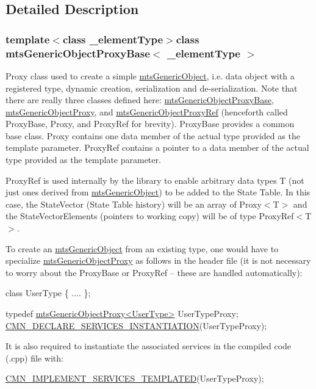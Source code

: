 \subsection{Detailed Description}
\subsubsection*{template$<$class \-\_\-element\-Type$>$class mts\-Generic\-Object\-Proxy\-Base$<$ \-\_\-element\-Type $>$}

Proxy class used to create a simple \hyperlink{classmts_generic_object}{mts\-Generic\-Object}, i.\-e. data object with a registered type, dynamic creation, serialization and de-\/serialization. Note that there are really three classes defined here\-: \hyperlink{classmts_generic_object_proxy_base}{mts\-Generic\-Object\-Proxy\-Base}, \hyperlink{classmts_generic_object_proxy}{mts\-Generic\-Object\-Proxy}, and \hyperlink{classmts_generic_object_proxy_ref}{mts\-Generic\-Object\-Proxy\-Ref} (henceforth called Proxy\-Base, Proxy, and Proxy\-Ref for brevity). Proxy\-Base provides a common base class. Proxy contains one data member of the actual type provided as the template parameter. Proxy\-Ref contains a pointer to a data member of the actual type provided as the template parameter.

Proxy\-Ref is used internally by the library to enable arbitrary data types T (not just ones derived from \hyperlink{classmts_generic_object}{mts\-Generic\-Object}) to be added to the State Table. In this case, the State\-Vector (State Table history) will be an array of Proxy$<$\-T$>$ and the State\-Vector\-Elements (pointers to working copy) will be of type Proxy\-Ref$<$\-T$>$.

To create an \hyperlink{classmts_generic_object}{mts\-Generic\-Object} from an existing type, one would have to specialize \hyperlink{classmts_generic_object_proxy}{mts\-Generic\-Object\-Proxy} as follows in the header file (it is not necessary to worry about the Proxy\-Base or Proxy\-Ref -- these are handled automatically)\-: 
\begin{DoxyCode}
\textcolor{keyword}{class }UserType \{
    ....
\};

\textcolor{keyword}{typedef} \hyperlink{classmts_generic_object_proxy}{mtsGenericObjectProxy<UserType>} UserTypeProxy;
\hyperlink{cmn_class_register_macros_8h_a198d81818e0b66ebe53e692dc7c5d058}{CMN\_DECLARE\_SERVICES\_INSTANTIATION}(UserTypeProxy);
\end{DoxyCode}


It is also required to instantiate the associated services in the compiled code (.cpp) file with\-: 
\begin{DoxyCode}
\hyperlink{cmn_class_register_macros_8h_a6d3e8cb412f66ff7e73f3ab52290f471}{CMN\_IMPLEMENT\_SERVICES\_TEMPLATED}(UserTypeProxy);
\end{DoxyCode}


